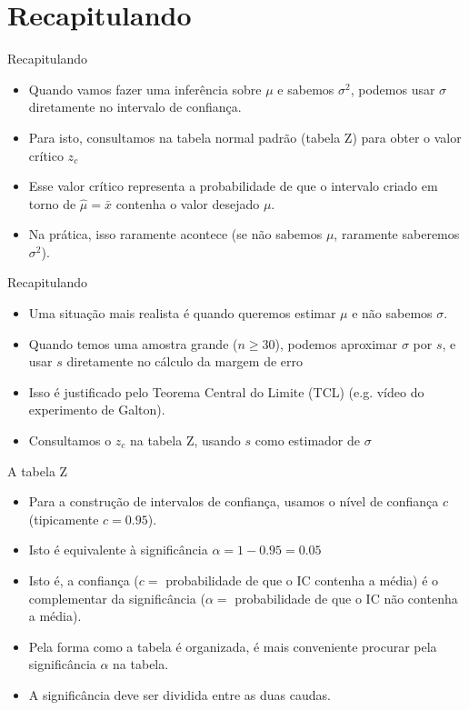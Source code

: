 \documentclass{beamer}
\begin{document}
\section{Recapitulando}

\begin{frame}{Recapitulando}
  \begin{itemize}
  \item Quando vamos fazer uma inferência sobre $\mu$ e
    \alert{sabemos} $\sigma^2$, podemos usar $\sigma$ diretamente no
    intervalo de confiança.
  \item Para isto, consultamos na tabela normal padrão (tabela Z) para
    obter o valor crítico $z_c$
  \item Esse valor crítico representa a probabilidade de que o
    intervalo criado em torno de $\hat{\mu} = \bar{x}$ contenha o
    valor desejado $\mu$.
  \item Na prática, isso raramente acontece (se não sabemos $\mu$,
    raramente saberemos $\sigma^2$).
  \end{itemize}
\end{frame}

\begin{frame}{Recapitulando}
  \begin{itemize}
  \item Uma situação mais realista é quando queremos estimar $\mu$ e
    não sabemos $\sigma$.
  \item Quando temos uma \alert{amostra grande} ($n \ge 30$), podemos
    aproximar $\sigma$ por $s$, e usar $s$ diretamente no cálculo
    da margem de erro
  \item Isso é justificado pelo Teorema Central do Limite (TCL) (e.g.
    vídeo do experimento de Galton).
  \item Consultamos o $z_c$ na tabela Z, usando $s$ como estimador de
    $\sigma$
  \end{itemize}
\end{frame}

\begin{frame}{A tabela Z}
  \begin{itemize}
  \item Para a construção de intervalos de confiança, usamos o nível
    de confiança $c$ (tipicamente $c=0.95$).
  \item Isto é equivalente à \alert{significância} $\alpha = 1-0.95 =
    0.05$
  \item Isto é, a confiança ($c=$ probabilidade de que o IC contenha a
    média) é o complementar da significância ($\alpha=$ probabilidade de que o
    IC não contenha a média).
  \item Pela forma como a tabela é organizada, é mais conveniente
    procurar pela significância $\alpha$ na tabela.
  \item A significância deve ser dividida entre as duas caudas.
  \end{itemize}
\end{frame}
\end{document}
